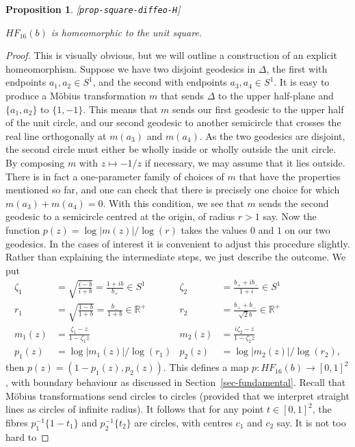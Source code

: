 \documentclass[reqno]{amsart}
\newcommand{\lbl}[1]{\label{#1}\textup{[\texttt{#1}]}\par}
\newcommand{\lbl}{\label}
\newcommand{\Dl}        {\Delta}
\newcommand{\zt}        {\zeta}
\newcommand{\R}         {{\mathbb{R}}}
\newcommand{\rt}        {\sqrt{2}}
\renewcommand{\:}{\colon}
\newtheorem{proposition}[theorem]{Proposition}
\theoremstyle{definition}
\begin{document}
\begin{proposition}\lbl{prop-square-diffeo-H}
 $HF_{16}(b)$ is homeomorphic to the unit square.
\end{proposition}
\begin{proof}
 This is visually obvious, but we will outline a construction of an
 explicit homeomorphism.  Suppose we have two disjoint geodesics in
 $\Dl$, the first with endpoints $a_1,a_2\in S^1$, and the second with
 endpoints $a_3,a_4\in S^1$.  It is easy to produce a M\"obius
 transformation $m$ that sends $\Dl$ to the upper half-plane and
 $\{a_1,a_2\}$ to $\{1,-1\}$.  This means that $m$ sends our first
 geodesic to the upper half of the unit circle, and our second
 geodesic to another semicircle that crosses the real line
 orthogonally at $m(a_3)$ and $m(a_4)$.  As the two geodesics are
 disjoint, the second circle must either be wholly inside or wholly
 outside the unit circle.  By composing $m$ with $z\mapsto -1/z$ if
 necessary, we may assume that it lies outside.  There is in fact a
 one-parameter family of choices of $m$ that have the properties
 mentioned so far, and one can check that there is precisely one
 choice for which $m(a_3)+m(a_4)=0$.  With this condition, we see that
 $m$ sends the second geodesic to a semicircle centred at the origin,
 of radius $r>1$ say.  Now the function $p(z)=\log|m(z)|/\log(r)$
 takes the values $0$ and $1$ on our two geodesics.  In the cases of
 interest it is convenient to adjust this procedure slightly.  Rather
 than explaining the intermediate steps, we just describe the
 outcome.  We put
 \begin{align*}
  \zt_1  &= \sqrt{\frac{i-b}{i+b}} = \frac{1+ib}{b_+} \in S^1 &
  \zt_2  &= \frac{b_++ib_-}{1+i} \in S^1 \\
  r_1    &= \sqrt{\frac{1-b}{1+b}} = \frac{b_-}{1+b} \in\R^+ &
  r_2    &= \frac{b_++b_-}{\rt b} \in\R^+ \\
  m_1(z) &= \frac{\zt_1 - z}{1 - \zt_1 z} &
  m_2(z) &= \frac{i\zt_2 - z}{1 - \zt_2 z} \\
  p_1(z) &= \log|m_1(z)|/\log(r_1) &
  p_2(z) &= \log|m_2(z)|/\log(r_2),
 \end{align*}
 then $p(z)=(1-p_1(z),p_2(z))$.  This defines a map
 $p\:HF_{16}(b)\to [0,1]^2$, with boundary behaviour as discussed in
 Section~\ref{sec-fundamental}.  Recall that M\"obius transformations
 send circles to circles (provided that we interpret straight lines as
 circles of infinite radius).  It follows that for any point
 $t\in[0,1]^2$, the fibres $p_1^{-1}\{1-t_1\}$ and $p_2^{-1}\{t_2\}$
 are circles, with centres $c_1$ and $c_2$ say.  It is not too hard to

\end{proof}
\end{document}

